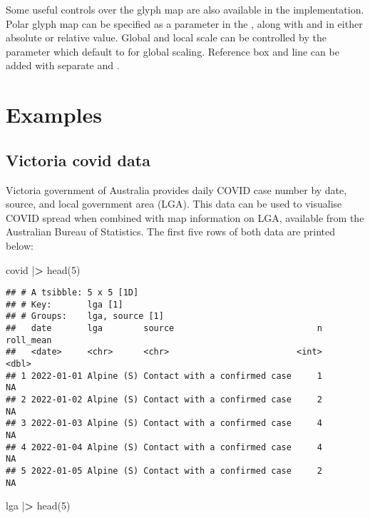 \documentclass{article}
\newenvironment{Shaded}{\begin{snugshade}}{\end{snugshade}}
\newcommand{\DecValTok}[1]{\textcolor[rgb]{0.00,0.00,0.81}{#1}}
\newcommand{\ErrorTok}[1]{\textcolor[rgb]{0.64,0.00,0.00}{\textbf{#1}}}
\newcommand{\FunctionTok}[1]{\textcolor[rgb]{0.00,0.00,0.00}{#1}}
\newcommand{\NormalTok}[1]{#1}
\newcommand{\SpecialCharTok}[1]{\textcolor[rgb]{0.00,0.00,0.00}{#1}}
\begin{document}
Some useful controls over the glyph map are also available in the  implementation. Polar glyph map can be specified as a parameter  in the , along with  and  in either absolute or relative value. Global and local scale can be controlled by the parameter  which default to  for global scaling. Reference box and line can be added with separate  and .

\hypertarget{examples}{%
\section{Examples}\label{examples}}

\hypertarget{covid}{%
\subsection{Victoria covid data}\label{covid}}

Victoria government of Australia provides daily COVID case number by date, source, and local government area (LGA). This data can be used to visualise COVID spread when combined with map information on LGA, available from the Australian Bureau of Statistics. The first five rows of both data are printed below:

\begin{Shaded}
\begin{Highlighting}[]
\NormalTok{covid }\SpecialCharTok{|}\ErrorTok{\textgreater{}} \FunctionTok{head}\NormalTok{(}\DecValTok{5}\NormalTok{)}
\end{Highlighting}
\end{Shaded}

\begin{verbatim}
## # A tsibble: 5 x 5 [1D]
## # Key:       lga [1]
## # Groups:    lga, source [1]
##   date       lga        source                            n roll_mean
##   <date>     <chr>      <chr>                         <int>     <dbl>
## 1 2022-01-01 Alpine (S) Contact with a confirmed case     1        NA
## 2 2022-01-02 Alpine (S) Contact with a confirmed case     2        NA
## 3 2022-01-03 Alpine (S) Contact with a confirmed case     4        NA
## 4 2022-01-04 Alpine (S) Contact with a confirmed case     4        NA
## 5 2022-01-05 Alpine (S) Contact with a confirmed case     2        NA
\end{verbatim}

\begin{Shaded}
\begin{Highlighting}[]
\NormalTok{lga }\SpecialCharTok{|}\ErrorTok{\textgreater{}} \FunctionTok{head}\NormalTok{(}\DecValTok{5}\NormalTok{)}
\end{Highlighting}
\end{Shaded}
\end{document}
